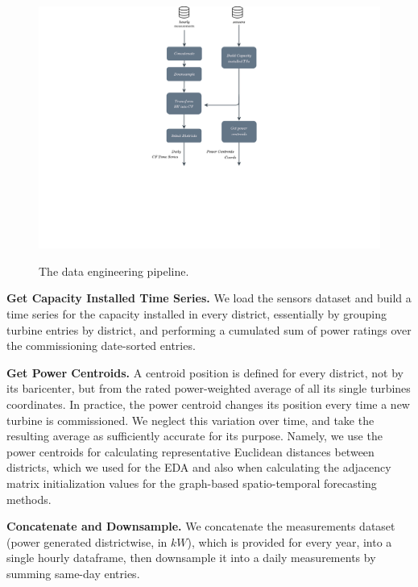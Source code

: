 \begin{figure}[H]
	\centering
    \caption{The data engineering pipeline.}
    \includegraphics[width=1.0\linewidth,trim={7cm 7cm 7cm 0cm},clip]{pipeline_de.pdf}
	\label{fig:pipeline_de}
\end{figure}

\vspace{1em}
\noindent
\textbf{Get Capacity Installed Time Series.}  We load the sensors dataset and build a time series for the capacity installed in every district, essentially by grouping  turbine entries by district, and performing a cumulated sum of power ratings over the commissioning date-sorted entries.

\vspace{1em}
\noindent
\textbf{Get Power Centroids.}  A centroid position is defined for every district, not by its baricenter, but from the rated power-weighted average of all its single turbines coordinates. In practice, the power centroid changes its position every time  a new turbine is commissioned. We neglect this variation over time, and take the resulting average as sufficiently accurate for its purpose. Namely, we use the power centroids for calculating representative Euclidean distances between districts, which we used for the EDA and also when calculating the adjacency matrix initialization values for the graph-based spatio-temporal forecasting methods.

\vspace{1em}
\noindent
\textbf{Concatenate and Downsample.}  We concatenate the measurements dataset (power generated districtwise, in $kW$), which is provided for every year, into a single hourly dataframe, then downsample it into a daily measurements by summing same-day entries.

